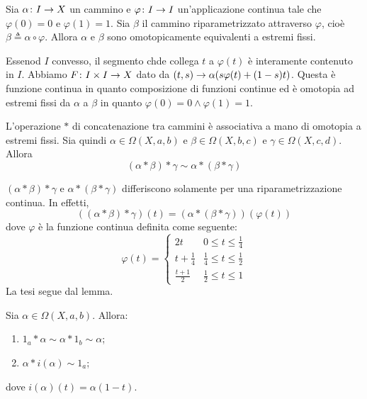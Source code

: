 \documentclass[a4paper]{article}
\begin{document}
\begin{snippetlemma}{}
    Sia \(\alpha \colon I \to X\) un cammino e
    \(\varphi \colon I \to I\) un'applicazione
    continua tale che \(\varphi(0) = 0\)
    e \(\varphi(1) = 1\). Sia \(\beta\)
    il cammino riparametrizzato attraverso \(\varphi\),
    cioè
    \(\beta \triangleq \alpha \circ \varphi\).
    Allora \(\alpha\) e \(\beta\) sono omotopicamente equivalenti
    a estremi fissi.
\end{snippetlemma}

\begin{snippetproof}{}
    Essenod \(I\) convesso, il segmento chde collega
    \(t\) a \(\varphi(t)\) è interamente contenuto in \(I\).
    Abbiamo \(F \colon I \times I \to X\)
    dato da \((t,s) \to \alpha(s \varphi(t) + (1-s)t)\).
    Questa è funzione continua in quanto composizione di funzioni continue
    ed è omotopia ad estremi fissi da \(\alpha\) a \(\beta\)
    in quanto \(\varphi(0) = 0 \land \varphi(1) = 1\).
\end{snippetproof}

\begin{snippetproposition}{}
    L'operazione \(\ast\) di concatenazione tra cammini è
    associativa a mano di omotopia a estremi fissi.
    Sia quindi \(\alpha \in \Omega(X, a,b)\)
    e \(\beta \in \Omega(X, b, c)\)
    e \(\gamma \in \Omega(X, c, d)\).
    Allora
    \[
        (\alpha \ast \beta)
        \ast \gamma \sim \alpha \ast (\beta \ast \gamma)
    \]
\end{snippetproposition}

\begin{snippetproof}{}
    \((\alpha \ast \beta) \ast \gamma\)
    e \(\alpha \ast (\beta \ast \gamma)\)
    differiscono solamente per una riparametrizzazione continua.
    In effetti,
    \[((\alpha \ast \beta)\ast \gamma)(t) = (\alpha \ast (\beta \ast \gamma))(\varphi(t))\]
    dove \(\varphi\) è la funzione continua definita come seguente:
    \[
        \varphi(t) = \begin{cases}
            2t & 0 \leq t \leq \frac14 \\
            t + \frac14 & \frac14 \leq t \leq \frac12 \\
            \frac{t + 1}{2} & \frac12 \leq t \leq 1
        \end{cases}
    \]
    La tesi segue dal lemma.
\end{snippetproof}

\begin{snippetproposition}{}
    Sia \(\alpha \in \Omega(X, a, b)\).
    Allora:
    \begin{enumerate}
        \item \(1_a \ast \alpha \sim \alpha \ast 1_b \sim \alpha\);
        \item \(\alpha \ast i(\alpha) \sim 1_a\);
    \end{enumerate}
    dove \(i(\alpha)(t) = \alpha(1-t)\).
\end{snippetproposition}
\end{document}
